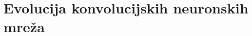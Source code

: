 
\chapter{Evolucija konvolucijskih neuronskih mreža}\label{ch:evolucija-konvolucijskih-neuronskih-mreza}
